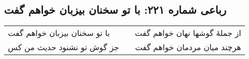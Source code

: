 \begin{center}
\section*{رباعی شماره ۲۲۱: با تو سخنان بیزبان خواهم گفت}
\label{sec:0221}
\begin{longtable}{l p{0.5cm} r}
با تو سخنان بیزبان خواهم گفت
&&
از جملهٔ گوشها نهان خواهم گفت
\\
جز گوش تو نشنود حدیث من کس
&&
هرچند میان مردمان خواهم گفت
\\
\end{longtable}
\end{center}

